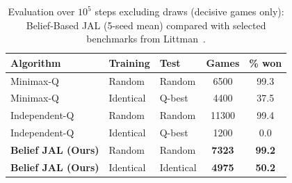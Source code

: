 \begin{table}[htbp]
    \centering
    \scriptsize
    \setlength{\tabcolsep}{4.5pt}
    \caption{Evaluation over $10^5$ steps excluding draws (decisive games only): Belief-Based JAL (5-seed mean) compared with selected benchmarks from Littman~\cite{littman1994markov}.}
    \label{tab:marl_results}
    \begin{tabular}{lllcc}
        \toprule
        \textbf{Algorithm}                     & \textbf{Training} & \textbf{Test} & \textbf{Games} & \textbf{\% won} \\
        \midrule
        Minimax-Q~\cite{littman1994markov}     & Random            & Random        & 6500           & 99.3            \\
        Minimax-Q~\cite{littman1994markov}     & Identical         & Q-best        & 4400           & 37.5            \\
        \midrule
        Independent-Q~\cite{littman1994markov} & Random            & Random        & 11300          & 99.4            \\
        Independent-Q~\cite{littman1994markov} & Identical         & Q-best        & 1200           & 0.0             \\
        \midrule
        \textbf{Belief JAL (Ours)}             & Random            & Random        & \textbf{7323}  & \textbf{99.2}   \\
        \textbf{Belief JAL (Ours)}             & Identical         & Identical     & \textbf{4975}  & \textbf{50.2}   \\
        \bottomrule
    \end{tabular}
\end{table}
